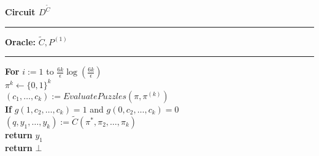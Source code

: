 \begin{codeblock}
  \textbf{Circuit $D^{\widetilde{C}}$}
  \medskip

  \hrule

  \medskip

  \textbf{Oracle:}  $\widetilde{C}, P^{(1)}$\\

  \medskip\hrule\medskip
  \textbf{For} $i:=1$ to $\frac{6k}{\epsilon} \log(\frac{6k}{\epsilon})$\\
  \IndI $\pi^{k} \leftarrow \{0,1\}^{k}$\\
  \IndI $(c_1, \dots, c_k) := EvaluatePuzzles(\pi, \pi^{(k)})$\\
  \IndI \textbf{If} $g(1,c_2, \dots, c_k) = 1$ and $g(0,c_2, \dots, c_k) = 0$\\
  \IndII $(q, y_1, \dots, y_k) := \widetilde{C}(\pi^*, \pi_2, \dots, \pi_k)$\\
  \IndII \textbf{return} $y_1$\\
  \textbf{return} $\bot$ \\

\end{codeblock}







